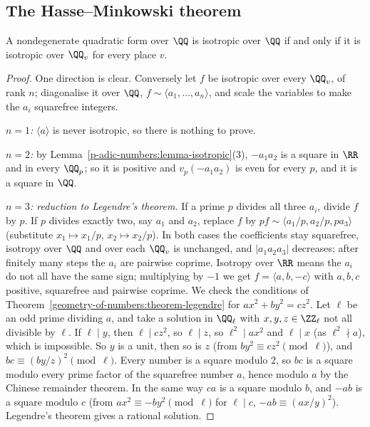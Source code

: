 \subsection{The Hasse--Minkowski theorem}\label{p-adic-numbers:subsection-hasse-minkowski}

\begin{theorem}\label{p-adic-numbers:theorem-hasse-minkowski}
A nondegenerate quadratic form over $\QQ$ is isotropic over $\QQ$ if and only if it is isotropic over $\QQ_v$ for every place $v$.
\end{theorem}

\begin{proof}
One direction is clear. Conversely let $f$ be isotropic over every $\QQ_v$, of rank $n$; diagonalise it over $\QQ$, $f \sim \langle a_1, \ldots, a_n\rangle$, and scale the variables to make the $a_i$ squarefree
integers.

\emph{$n = 1$:} $\langle a\rangle$ is never isotropic, so there is nothing to prove.

\emph{$n = 2$:} by Lemma~\ref{p-adic-numbers:lemma-isotropic}(3), $-a_1a_2$ is a square in $\RR$ and in every $\QQ_p$; so it is positive and $v_p(-a_1a_2)$ is even for every $p$, and it is a square in $\QQ$.

\emph{$n = 3$: reduction to Legendre's theorem.} If a prime $p$ divides all three $a_i$, divide $f$ by $p$. If $p$ divides exactly two, say $a_1$ and $a_2$, replace $f$ by
$pf \sim \langle a_1/p, a_2/p, pa_3\rangle$ (substitute $x_1 \mapsto x_1/p$, $x_2 \mapsto x_2/p$). In both cases the coefficients stay squarefree, isotropy over $\QQ$ and over each $\QQ_v$ is unchanged, and
$|a_1a_2a_3|$ decreases; after finitely many steps the $a_i$ are pairwise coprime. Isotropy over $\RR$ means the $a_i$ do not all have the same sign; multiplying by $-1$ we get $f = \langle a, b, -c\rangle$
with $a, b, c$ positive, squarefree and pairwise coprime. We check the conditions of Theorem~\ref{geometry-of-numbers:theorem-legendre} for $ax^2 + by^2 = cz^2$. Let $\ell$ be an odd prime dividing $a$, and take a
solution in $\QQ_\ell$ with $x, y, z \in \ZZ_\ell$ not all divisible by $\ell$. If $\ell \mid y$, then $\ell \mid cz^2$, so $\ell \mid z$, so $\ell^2 \mid ax^2$ and $\ell \mid x$ (as $\ell^2 \nmid a$), which is impossible.
So $y$ is a unit, then so is $z$ (from $by^2 \equiv cz^2 \pmod\ell$), and $bc \equiv (by/z)^2 \pmod\ell$. Every number is a square modulo $2$, so $bc$ is a square modulo every prime factor of the squarefree number $a$,
hence modulo $a$ by the Chinese remainder theorem. In the same way $ca$ is a square modulo $b$, and $-ab$ is a square modulo $c$ (from $ax^2 \equiv -by^2 \pmod\ell$ for $\ell \mid c$, $-ab \equiv (ax/y)^2$).
Legendre's theorem gives a rational solution.


\end{proof}
